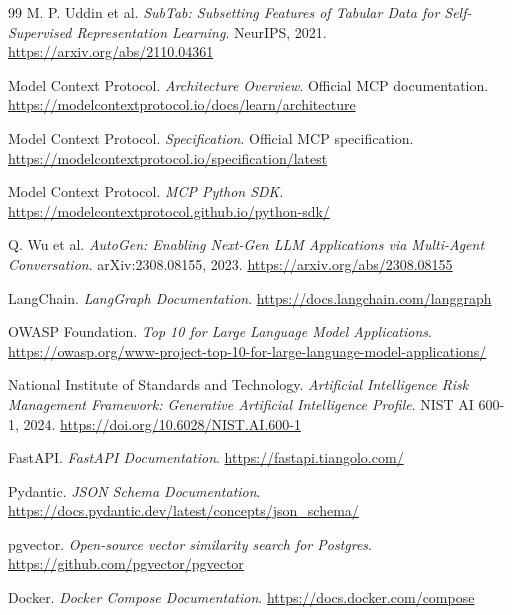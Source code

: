 \begin{thebibliography}{99}
M. P. Uddin et al.
\newblock \textit{SubTab: Subsetting Features of Tabular Data for Self-Supervised Representation Learning}.
\newblock NeurIPS, 2021.
\newblock \url{https://arxiv.org/abs/2110.04361}

Model Context Protocol.
\newblock \textit{Architecture Overview}.
\newblock Official MCP documentation.
\newblock \url{https://modelcontextprotocol.io/docs/learn/architecture}

Model Context Protocol.
\newblock \textit{Specification}.
\newblock Official MCP specification.
\newblock \url{https://modelcontextprotocol.io/specification/latest}

Model Context Protocol.
\newblock \textit{MCP Python SDK}.
\newblock \url{https://modelcontextprotocol.github.io/python-sdk/}

Q. Wu et al.
\newblock \textit{AutoGen: Enabling Next-Gen LLM Applications via Multi-Agent Conversation}.
\newblock arXiv:2308.08155, 2023.
\newblock \url{https://arxiv.org/abs/2308.08155}

LangChain.
\newblock \textit{LangGraph Documentation}.
\newblock \url{https://docs.langchain.com/langgraph}

OWASP Foundation.
\newblock \textit{Top 10 for Large Language Model Applications}.
\newblock \url{https://owasp.org/www-project-top-10-for-large-language-model-applications/}

National Institute of Standards and Technology.
\newblock \textit{Artificial Intelligence Risk Management Framework: Generative Artificial Intelligence Profile}.
\newblock NIST AI 600-1, 2024.
\newblock \url{https://doi.org/10.6028/NIST.AI.600-1}

FastAPI.
\newblock \textit{FastAPI Documentation}.
\newblock \url{https://fastapi.tiangolo.com/}

Pydantic.
\newblock \textit{JSON Schema Documentation}.
\newblock \url{https://docs.pydantic.dev/latest/concepts/json_schema/}

pgvector.
\newblock \textit{Open-source vector similarity search for Postgres}.
\newblock \url{https://github.com/pgvector/pgvector}

Docker.
\newblock \textit{Docker Compose Documentation}.
\newblock \url{https://docs.docker.com/compose}


\end{thebibliography}
